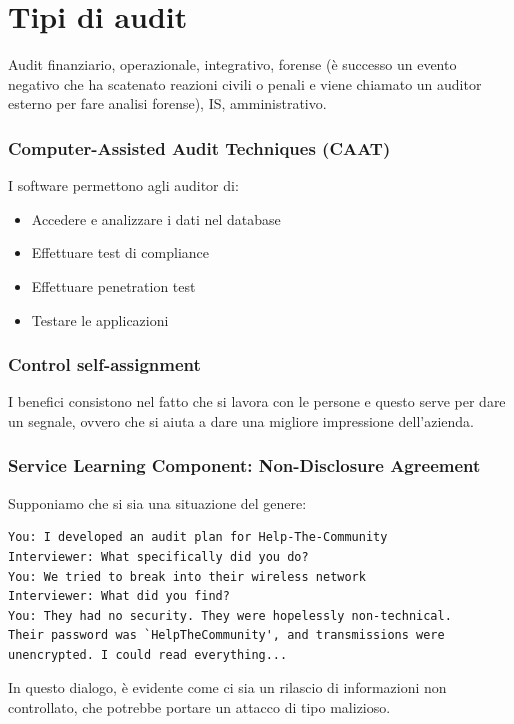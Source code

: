 \section{Tipi di audit}

Audit finanziario, operazionale, integrativo, forense (è successo un evento
negativo che ha scatenato reazioni civili o penali e viene chiamato un auditor
esterno per fare analisi forense), IS, amministrativo.

\subsubsection{Computer-Assisted Audit Techniques (CAAT)}

I software permettono agli auditor di:
\begin{itemize}
\item Accedere e analizzare i dati nel database
\item Effettuare test di compliance
\item Effettuare penetration test
\item Testare le applicazioni
\end{itemize}


\subsubsection{Control self-assignment}
I benefici consistono nel fatto che si lavora con le persone e questo serve per
dare un segnale, ovvero che si aiuta a dare una migliore impressione
dell'azienda.



\subsubsection{Service Learning Component: Non-Disclosure Agreement}

Supponiamo che si sia una situazione del genere:

\begin{verbatim}
You: I developed an audit plan for Help-The-Community
Interviewer: What specifically did you do?
You: We tried to break into their wireless network
Interviewer: What did you find?
You: They had no security. They were hopelessly non-technical.
Their password was `HelpTheCommunity', and transmissions were
unencrypted. I could read everything...
\end{verbatim}

In questo dialogo, è evidente come ci sia un rilascio di informazioni non
controllato, che potrebbe portare un attacco di tipo malizioso.






